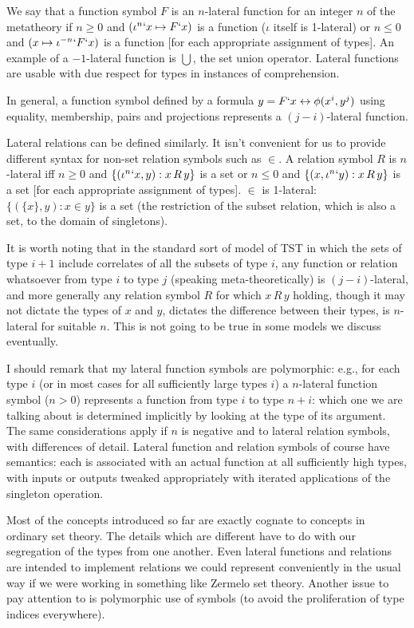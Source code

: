 \documentclass[12pt]{article}
\begin{document}
We say that a function symbol $F$ is an $n$-lateral function for an integer $n$ of the metatheory  if $n\geq 0$ and $(\iota^n`x \mapsto F`x)$ is a function ($\iota$ itself is 1-lateral)
or $n\leq 0$ and $(x \mapsto \iota^{-n}`F`x)$ is a function [for each appropriate assignment of types]. An example of a $-1$-lateral function is $\bigcup$, the set union operator.   Lateral functions are usable with due respect for types in instances of comprehension.

In general, a function symbol defined by a formula $y = F`x \leftrightarrow \phi(x^i,y^j)$ using equality, membership, pairs and projections represents a $(j-i)$-lateral function.

Lateral relations can be defined similarly.  It isn't convenient for us to provide different syntax for non-set relation symbols such as $\in$.  A relation symbol
$R$ is $n$-lateral iff $n \geq 0$ and $\{(\iota^n`x,y):x \, R\, y\}$ is a set or $n \leq 0$ and $\{(x,\iota^n`y):x \, R\, y\}$ is a set [for each appropriate assignment of types].  $\in$ is 1-lateral:  $\{(\{x\},y):x \in y\}$ is a set (the restriction of the subset relation, which is also a set, to the domain of singletons).

It is worth noting that in the standard sort of model of TST in which the sets of type $i+1$ include correlates of all the subsets of type $i$, any function or relation whatsoever from 
type $i$ to type $j$ (speaking meta-theoretically) is $(j-i)$-lateral, and more generally any relation symbol $R$ for which $x\,R\, y$ holding, though it may not dictate the types of $x$ and $y$, dictates the difference between their types, is $n$-lateral for suitable $n$.   This is not going to be true in some models we discuss eventually.

I should remark that my lateral function symbols are polymorphic:  e.g., for each type $i$ (or in most cases for all sufficiently large types $i$) a $n$-lateral function symbol ($n>0$)
represents a function from type $i$ to type $n+i$:  which one we are talking about is determined implicitly by looking at the type of its argument.  The same considerations apply if $n$ is negative and to lateral relation symbols, with differences of detail.  Lateral function and relation symbols of course have semantics:  each is associated with an actual function
at all sufficiently high types, with inputs or outputs tweaked appropriately with iterated applications of the singleton operation.

Most of the concepts introduced so far are exactly cognate to concepts in ordinary set theory.  The details which are different have to do with our segregation of the types from one another.
Even lateral functions and relations are intended to implement relations we could represent conveniently in the usual way if we were working in something like Zermelo set theory.  Another issue to pay attention to is polymorphic use of symbols (to avoid the proliferation of type indices everywhere).
\end{document}
